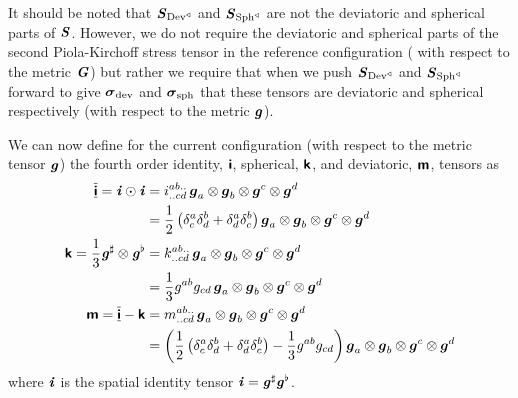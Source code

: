 It should be noted that $\boldsymbol{\mathit{S}}_{ \operatorname{Dev}^{\triangleleft} }$ and
$\boldsymbol{\mathit{S}}_{ \operatorname{Sph}^{\triangleleft} }$ are not the deviatoric and spherical parts
of $\boldsymbol{\mathit{S}}$. However, we do not require the deviatoric and spherical parts
of the second Piola-Kirchoff stress tensor in the reference configuration (\ie
with respect to the metric $\boldsymbol{\mathit{G}}$) but rather we require that when we
push $\boldsymbol{\mathit{S}}_{ \operatorname{Dev}^{\triangleleft} }$ and
$\boldsymbol{\mathit{S}}_{ \operatorname{Sph}^{\triangleleft} }$ forward to give $\boldsymbol{\mathit{\sigma}}_{\operatorname{dev}}$
and $\boldsymbol{\mathit{\sigma}}_{\operatorname{sph}}$ that these tensors are deviatoric and
spherical respectively (\ie with respect to the metric $\boldsymbol{\mathit{g}}$).

We can now define for the current configuration (\ie with respect to the
metric tensor $\boldsymbol{\mathit{g}}$) the fourth order identity,
$  \boldsymbol{\mathsf{ i }}  $, spherical, $  \boldsymbol{\mathsf{ k }}  $, and deviatoric,
$  \boldsymbol{\mathsf{ m }}  $, tensors as
\begin{align}
    \overline{\underline{\boldsymbol{\mathsf{ i }}}}  =   \boldsymbol{\mathit{ i }}   \odot \boldsymbol{\mathit{  \boldsymbol{\mathit{ i }}  }} &=
   i ^{ab..}_{..cd}\,  \boldsymbol{g} _{a} \otimes  \boldsymbol{g} _{b} \otimes  \boldsymbol{g} ^{c} \otimes  \boldsymbol{g} ^{d} \\ \nonumber
  &=
  \dfrac{1}{2}\left(  \delta^{a}_{c}  \delta^{b}_{d} + \delta^{a}_{d}  \delta^{b}_{c}  \right)  \boldsymbol{g} _{a} \otimes  \boldsymbol{g} _{b} \otimes  \boldsymbol{g} ^{c} \otimes  \boldsymbol{g} ^{d} 
  \\
    \boldsymbol{\mathsf{ k }}  =\dfrac{1}{3}  \boldsymbol{\mathit{g}}^{\sharp}  \otimes \boldsymbol{\mathit{g}}^{\flat} &=
   k ^{ab..}_{..cd}\,  \boldsymbol{g} _{a} \otimes  \boldsymbol{g} _{b} \otimes  \boldsymbol{g} ^{c} \otimes  \boldsymbol{g} ^{d} \\ \nonumber
  &=
  \dfrac{1}{3}g^{ab}g_{cd}\,  \boldsymbol{g} _{a} \otimes  \boldsymbol{g} _{b} \otimes  \boldsymbol{g} ^{c} \otimes  \boldsymbol{g} ^{d} \\
    \boldsymbol{\mathsf{ m }}  =  \overline{\underline{\boldsymbol{\mathsf{ i }}}}  -  \boldsymbol{\mathsf{ k }}  &=
   m ^{ab..}_{..cd}\,  \boldsymbol{g} _{a} \otimes  \boldsymbol{g} _{b} \otimes  \boldsymbol{g} ^{c} \otimes  \boldsymbol{g} ^{d} \\ \nonumber
  &=
  \left( \dfrac{1}{2}\left(  \delta^{a}_{c}  \delta^{b}_{d} + \delta^{a}_{d}  \delta^{b}_{c}  \right)-\dfrac{1}{3}g^{ab}g_{cd} \right)  \boldsymbol{g} _{a} \otimes  \boldsymbol{g} _{b} \otimes  \boldsymbol{g} ^{c} \otimes  \boldsymbol{g} ^{d} 
\end{align}
where $  \boldsymbol{\mathit{ i }}  $ is the spatial identity tensor \ie
$  \boldsymbol{\mathit{ i }}  = \boldsymbol{\mathit{g}}^{\sharp} \boldsymbol{\mathit{g}}^{\flat}$.

